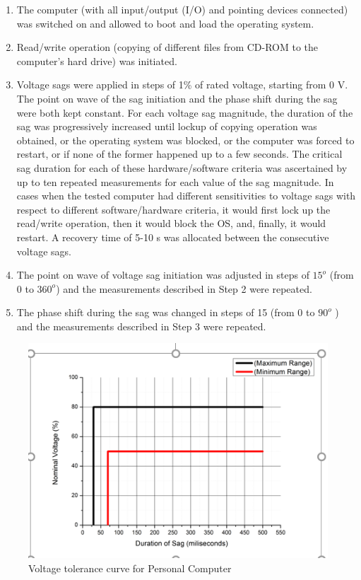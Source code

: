 \documentclass[14pt, a4paper]{extreport}
\begin{document}
\begin{enumerate}
    \item The computer (with all input/output (I/O) and pointing devices connected) was switched on and allowed to boot and load the operating system.
    
    \item Read/write operation (copying of different files from CD-ROM to the computer’s hard drive) was initiated.
    
    \item Voltage sags were applied in steps of 1\% of rated voltage, starting from 0 V. The point on wave of the sag initiation and the phase shift during the sag were both kept constant. For each voltage sag magnitude, the duration of the sag was progressively increased until lockup of copying operation was obtained, or the operating system was blocked, or the computer was forced to restart, or if none of the former happened up to a few seconds. The critical sag duration for each of these hardware/software criteria was ascertained by up to ten repeated measurements for each value of the sag magnitude. In cases when the tested computer had different sensitivities to voltage sags with respect to different software/hardware criteria, it would first lock up the read/write operation, then it would block the OS, and, finally, it would restart. A recovery time of 5-10 s was allocated between the consecutive voltage sags.
    
    \item The point on wave of voltage sag initiation was adjusted in steps of $15^{o}$ (from 0 to $360^{o}$) and the  measurements described in Step 2 were repeated.
 \item  The phase shift during the sag was changed in steps of 15 (from 0 to $90^{o}$ ) and the measurements described in Step 3 were repeated.
 \end{enumerate}
 \begin{figure}
     \centering
     \includegraphics[width=\textwidth]{pc.PNG}
     \caption{ Voltage tolerance curve for Personal Computer}
     \label{fig:PC_characteristics}
 \end{figure}
 
\end{document}
